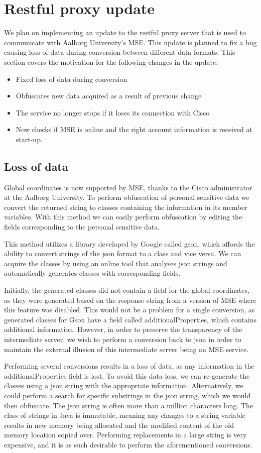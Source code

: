 \section{Restful proxy update}
We plan on implementing an update to the restful proxy server that is used to communicate with Aalborg University's MSE. This update is planned to fix a bug causing loss of data during conversion between different data formats. This section covers the motivation for the following changes in the update:

\begin{itemize}
\item Fixed loss of data during conversion
\item Obfuscates new data acquired as a result of previous change
\item The service no longer stops if it loses its connection with Cisco
\item Now checks if MSE is online and the right account information is received at start-up.
\end{itemize}

\subsection{Loss of data}
Global coordinates is now supported by MSE, thanks to the Cisco administrator at the Aalborg University. To perform obfuscation of personal sensitive data we convert the returned string to classes containing the information in its member variables. With this method we can easily perform obfuscation by editing the fields corresponding to the personal sensitive data. 

This method utilizes a library developed by Google called gson, which affords the ability to convert strings of the json format to a class and vice versa. We can acquire the classes by using an online tool that analyses json strings and automatically generates classes with corresponding fields.

Initially, the generated classes did not contain a field for the global coordinates, as they were generated based on the response string from a version of MSE where this feature was disabled. This would not be a problem for a single conversion, as generated classes for Gson have a field called additionalProperties, which contains additional information. However, in order to preserve the transparency of the intermediate server, we wish to perform a conversion back to json in order to maintain the external illusion of this intermediate server being an MSE service.

Performing several conversions results in a loss of data, as any information in the additionalProperties field is lost. To avoid this data loss, we can re-generate the classes using a json string with the appropriate information. Alternatively, we could perform a search for specific substrings in the json string, which we would then obfuscate. The json string is often more than a million characters long. The class of strings in Java is immutable, meaning any changes to a string variable results in new memory being allocated and the modified content of the old memory location copied over. Performing replacements in a large string is very expensive, and it is as such desirable to perform the aforementioned conversions. 